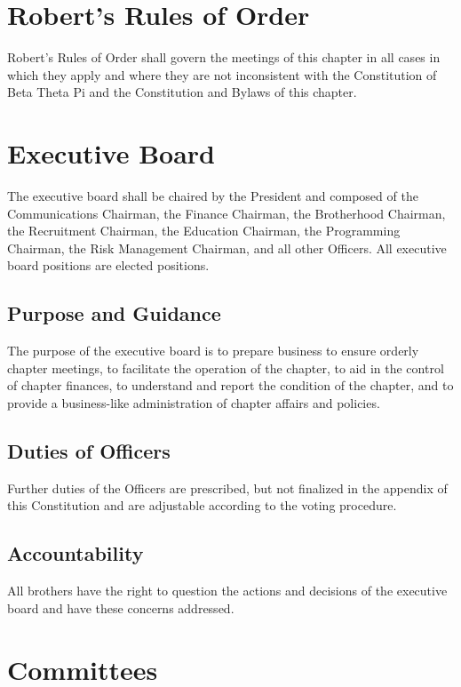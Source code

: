 \section{Robert’s Rules of Order}

Robert’s Rules of Order shall govern the meetings of this chapter in all cases in which they apply and where they are not inconsistent with the Constitution of Beta Theta Pi and the Constitution and Bylaws of this chapter.



\section{Executive Board}

The executive board shall be chaired by the President and composed of the Communications Chairman, the Finance Chairman, the Brotherhood Chairman, the Recruitment Chairman, the Education Chairman, the Programming Chairman, the Risk Management Chairman, and all other Officers.
All executive board positions are elected positions.

\subsection{Purpose and Guidance}

The purpose of the executive board is to prepare business to ensure orderly chapter meetings, to facilitate the operation of the chapter, to aid in the control of chapter finances, to understand and report the condition of the chapter, and to provide a business-like administration of chapter affairs and policies.

\subsection{Duties of Officers}

Further duties of the Officers are prescribed, but not finalized in the appendix of this Constitution and are adjustable according to the voting procedure.

\subsection{Accountability}

All brothers have the right to question the actions and decisions of the executive board and have these concerns addressed.

\section{Committees}

